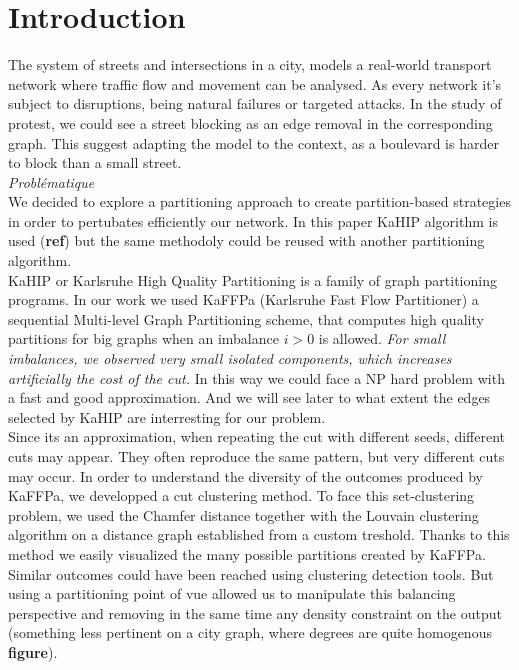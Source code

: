 \section{Introduction}
\label{sec:introduction}
The system of streets and intersections in a city, models a real-world transport network where traffic flow and movement can be analysed. As every network it's subject to disruptions, being natural failures or targeted attacks. In the study of protest, we could see a street blocking as an edge removal in the corresponding graph. This suggest adapting the model to the context, as a boulevard is harder to block than a small street.\\
\emph{Problématique}\\
We decided to explore a partitioning approach to create partition-based strategies in order to pertubates efficiently our network. In this paper KaHIP algorithm is used (\textbf{ref}) but the same methodoly could be reused with another partitioning algorithm.\\
KaHIP or Karlsruhe High Quality Partitioning is a family of graph partitioning programs. In our work we used KaFFPa (Karlsruhe Fast Flow Partitioner) a sequential Multi-level Graph Partitioning scheme, that computes high quality partitions for big graphs when an imbalance $i > 0$ is allowed. \emph{For small imbalances, we observed very small isolated components, which increases artificially the cost of the cut.} In this way we could face a NP hard problem with a fast and good approximation. And we will see later to what extent the edges selected by KaHIP are interresting for our problem.\\
Since its an approximation, when repeating the cut with different seeds, different cuts may appear. They often reproduce the same pattern, but very different cuts may occur. In order to understand the diversity of the outcomes produced by KaFFPa, we developped a cut clustering method. To face this set-clustering problem, we used the Chamfer distance together with the Louvain clustering algorithm on a distance graph established from a custom treshold. Thanks to this method we easily visualized the many possible partitions created by KaFFPa.\\
Similar outcomes could have been reached using clustering detection tools. But using a partitioning point of vue allowed us to manipulate this balancing perspective and removing in the same time any density constraint on the output (something less pertinent on a city graph, where degrees are quite homogenous \textbf{figure}).

